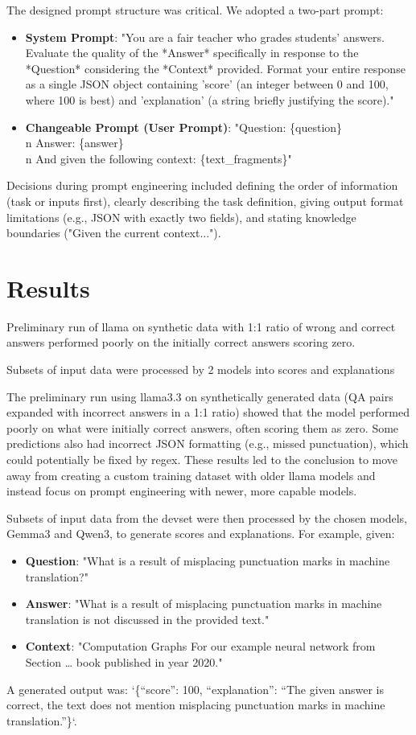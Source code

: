 \documentclass[fleqn,10pt]{olplainarticle}
\begin{document}
The designed prompt structure was critical. We adopted a two-part prompt:
\begin{itemize}
    \item \textbf{System Prompt}: "You are a fair teacher who grades students' answers. Evaluate the quality of the *Answer* specifically in response to the *Question* considering the *Context* provided. Format your entire response as a single JSON object containing 'score' (an integer between 0 and 100, where 100 is best) and 'explanation' (a string briefly justifying the score)."
    \item \textbf{Changeable Prompt (User Prompt)}: 
    "Question: \{question\}\\n
    Answer: \{answer\}\\n
    And given the following context: \{text\_fragments\}"
\end{itemize}
Decisions during prompt engineering included defining the order of information (task or inputs first), clearly describing the task definition, giving output format limitations (e.g., JSON with exactly two fields), and stating knowledge boundaries ("Given the current context...").


\section*{Results}

Preliminary run of llama on synthetic data with 1:1 ratio of wrong and correct answers performed poorly on the initially correct answers scoring zero. 

Subsets of input data were processed by 2 models into scores and explanations

The preliminary run using llama3.3 on synthetically generated data (QA pairs expanded with incorrect answers in a 1:1 ratio) showed that the model performed poorly on what were initially correct answers, often scoring them as zero. Some predictions also had incorrect JSON formatting (e.g., missed punctuation), which could potentially be fixed by regex. These results led to the conclusion to move away from creating a custom training dataset with older llama models and instead focus on prompt engineering with newer, more capable models.

Subsets of input data from the devset were then processed by the chosen models, Gemma3 and Qwen3, to generate scores and explanations.
For example, given:
\begin{itemize}
    \item \textbf{Question}: "What is a result of misplacing punctuation marks in machine translation?"
    \item \textbf{Answer}: "What is a result of misplacing punctuation marks in machine translation is not discussed in the provided text."
    \item \textbf{Context}: "Computation Graphs For our example neural network from Section … book published in year 2020."
\end{itemize}
A generated output was: `\{“score”: 100, “explanation”: “The given answer is correct, the text does not mention misplacing punctuation marks in machine translation.”\}`.
\end{document}
